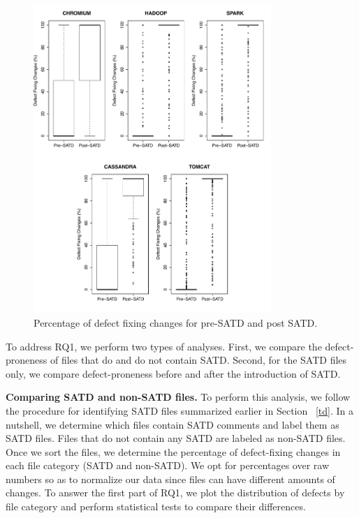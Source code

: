 \begin{figure}[tb]
	\centering
	\includegraphics[width=90mm]{figures/chapter3/rq1-2_correction}
	\caption{Percentage of defect fixing changes for  pre-SATD and post SATD.}
	\label{figure:preVpost}
\end{figure}

 To address RQ1, we perform two types of analyses. First, we compare the defect-proneness of files that do and do not contain SATD. Second, for the SATD files only, we compare defect-proneness before and after the introduction of SATD.

\noindent\textbf{Comparing SATD and non-SATD files.} To perform this analysis, we follow the procedure for identifying SATD files summarized earlier in Section ~\ref{td}. In a nutshell, we determine which files contain SATD comments and label them as SATD files. Files that do not contain any SATD are labeled as non-SATD files. Once we sort the files, we determine the percentage of defect-fixing changes in each file category (SATD and non-SATD). We opt for percentages over raw numbers so as to normalize our data since files can have different amounts of changes. To answer the first part of RQ1, we plot the distribution of defects by file category and perform statistical tests to compare their differences.


